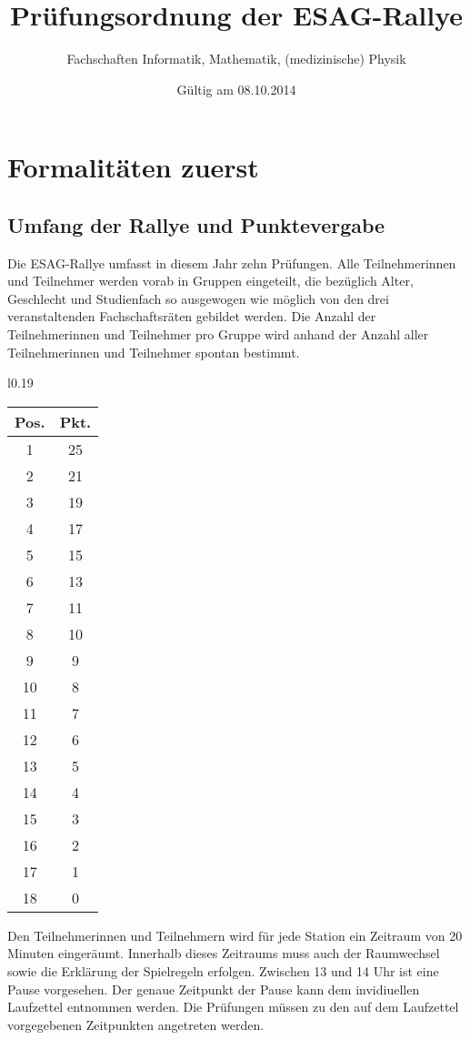 \documentclass[a4paper,10pt]{article}
\title{Prüfungsordnung der ESAG-Rallye}
\author{Fachschaften Informatik, Mathematik, (medizinische) Physik}
\date{Gültig am 08.10.2014}
\begin{document}
\pagestyle{plain}
\maketitle
\tableofcontents

\newpage
\pagestyle{plain}
\section[Formalitäten]{Formalitäten zuerst}

\subsection{Umfang der Rallye und Punktevergabe}

Die ESAG-Rallye umfasst in diesem Jahr zehn Prüfungen. Alle Teilnehmerinnen 
und Teilnehmer werden vorab in Gruppen eingeteilt, die bezüglich Alter, Geschlecht und
Studienfach so ausgewogen wie möglich von den drei veranstaltenden
Fachschaftsräten gebildet werden. Die Anzahl der Teilnehmerinnen und Teilnehmer pro Gruppe
wird anhand der Anzahl aller Teilnehmerinnen und Teilnehmer spontan bestimmt.

\begin{wrapfigure}{l}{0.19\textwidth}
\begin{tabular}{c|c}
\textbf{Pos.} & \textbf{Pkt.} \\
\hline
1 & 25\\
2 & 21 \\
3 & 19 \\
4 & 17 \\
5 & 15 \\
6 & 13 \\
7 & 11 \\
8 & 10 \\
9 & 9 \\
10 &8 \\
11 & 7 \\
12 & 6 \\
13 & 5 \\
14 & 4 \\
15 & 3\\
16 & 2\\
17 & 1\\
18 & 0 
\end{tabular}
\vspace{15pt}
\end{wrapfigure}

Den Teilnehmerinnen und Teilnehmern wird für jede Station ein Zeitraum 
von 20 Minuten eingeräumt. Innerhalb dieses Zeitraums muss auch der 
Raumwechsel sowie die Erklärung der Spielregeln erfolgen. Zwischen 
13 und 14 Uhr ist eine Pause vorgesehen. Der genaue Zeitpunkt der Pause 
kann dem invidiuellen Laufzettel entnommen werden. Die Prüfungen müssen 
zu den auf dem Laufzettel vorgegebenen Zeitpunkten angetreten werden.
\end{document}
